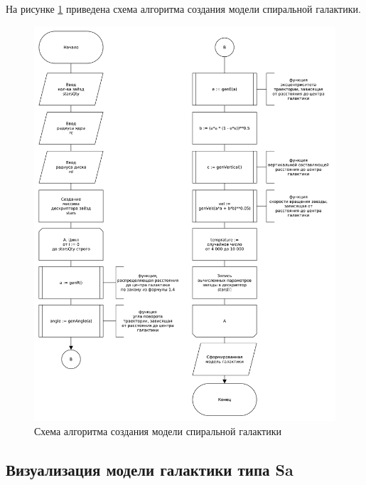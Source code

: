 На рисунке \ref{img:scheme_simulation} приведена схема алгоритма создания модели спиральной галактики.
\begin{figure}[H]
    \centering
    \includegraphics[scale=0.4]{pdf/scheme_simulation.pdf}
    \caption{Схема алгоритма создания модели спиральной галактики}
    \label{img:scheme_simulation}
\end{figure}

\subsection{Визуализация модели галактики типа Sa}

